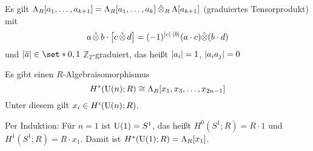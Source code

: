 Es gilt $\Lambda_R \benbrace*{a_1, \ldots ,a_{k+1}} = \Lambda_R \benbrace*{a_1, \ldots ,a_k} \mathbin{\hat{\otimes}_R} \Lambda \benbrace*{a_{k+1}}$ (graduiertes Tensorprodukt) mit 
\[
	a \mathop{\hat{\otimes}} b \cdot \benbrace*{c \mathop{\hat{\otimes}} d} = (-1)^{\abs*{c} \cdot \abs*{b}} (a \cdot c) \hat{\otimes} (b \cdot d)
\]
und $\abs*{\overline{a}} \in \set*{0,1} $ $\mathbb{Z}_2$-graduiert, das heißt $\abs*{a_i}=1$, $\abs*{a_i a_j}=0 $

\begin{satz}[{name=[Kohomologie der unitären Gruppe]}]
	Es gibt einen $R$-Algebraisomorphismus 
	\[
		H^*(\Un(n);R) \cong \Lambda_R \benbrace*{x_1, x_3, \ldots , x_{2n-1}}
	\]
	Unter diesem gilt $x_i \in H^i(\Un(n);R)$.
\end{satz}
\begin{beweis}
	Per Induktion: Für $n=1$ ist $\Un(1)=S^1$, das heißt $H^0(S^1;R) = R \cdot 1$ und $H^1(S^1;R) = R \cdot x_1$.
	Damit ist $H^*(\Un(1);R) = \Lambda_R[x_1]$.
	

\end{beweis}
